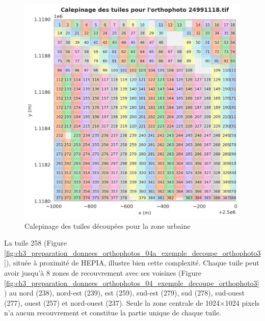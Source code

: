\begin{figure}[H]
    \centering
    \includegraphics[width=1\linewidth]{02-main/figures/ch3/ch3_preparation_donnees_orthophotos_03_exemple_decoupe_orthophoto2.png}
    \caption{Calepinage des tuiles découpées pour la zone urbaine}
    \label{fig:ch3_preparation_donnees_orthophotos_03_exemple_decoupe_orthophoto2}
\end{figure}

\newpage
La tuile 258 (Figure \ref{fig:ch3_preparation_donnees_orthophotos_04a_exemple_decoupe_orthophoto3}), située à proximité de HEPIA, illustre bien cette complexité. Chaque tuile peut avoir jusqu'à 8 zones de recouvrement avec ses voisines (Figure \ref{fig:ch3_preparation_donnees_orthophotos_04_exemple_decoupe_orthophoto3}) au nord (238), nord-est (239), est (259), sud-est (279), sud (278), sud-ouest (277), ouest (257) et nord-ouest (237). Seule la zone centrale de 1024×1024 pixels n'a aucun recouvrement et constitue la partie unique de chaque tuile.

